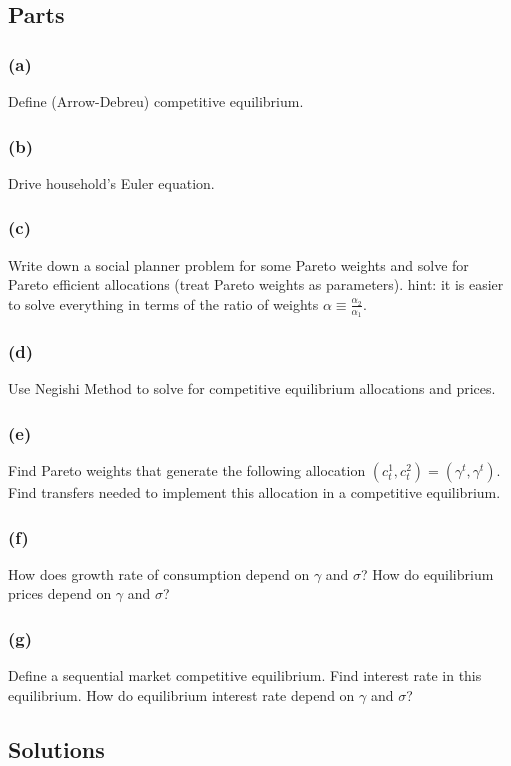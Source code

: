 \documentclass[10pt, a4paper]{article}
\begin{document}
  \subsection*{Parts}
    \subsubsection*{(a)}
      Define (Arrow-Debreu) competitive equilibrium.
    \subsubsection*{(b)}
      Drive household's Euler equation.
    \subsubsection*{(c)}
      Write down a social planner problem for some Pareto weights and solve for Pareto efficient allocations (treat Pareto weights as parameters). hint: it is easier to solve everything in terms of the ratio of weights $\alpha \equiv \frac{\alpha_2}{\alpha_1}$.
    \subsubsection*{(d)}
      Use Negishi Method to solve for competitive equilibrium allocations and prices.
    \subsubsection*{(e)}
      Find Pareto weights that generate the following allocation $(c^1_t, c^2_t) = (\gamma^t, \gamma^t)$. Find transfers needed to implement this allocation in a competitive equilibrium.
    \subsubsection*{(f)}
      How does growth rate of consumption depend on $\gamma$ and $\sigma$? How do equilibrium prices depend on $\gamma$ and $\sigma$?
    \subsubsection*{(g)}
      Define a sequential market competitive equilibrium. Find interest rate in this equilibrium. How do equilibrium interest rate depend on $\gamma$ and $\sigma$?
  \subsection*{Solutions}
\end{document}
